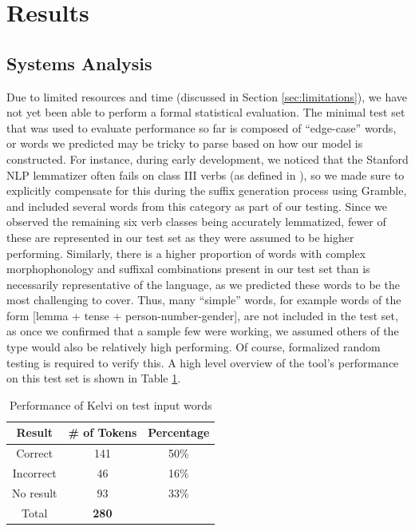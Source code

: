 \documentclass[11pt]{article}
\begin{document}
\section{Results}
\subsection{Systems Analysis}
Due to limited resources and time (discussed in Section \ref{sec:limitations}), 
we have not yet been able to perform a formal statistical evaluation. 
The minimal test set that was used to evaluate performance so far is 
composed of “edge-case” words, or words we predicted may be tricky to 
parse based on how our model is constructed. For instance, during early 
development, we noticed that the Stanford NLP lemmatizer often fails on 
class III verbs (as defined in \citealp{arden_progressive_1910}), so we made sure to explicitly 
compensate for this during the suffix generation process using Gramble, 
and included several words from this category as part of our testing. 
Since we observed the remaining six verb classes \citep{arden_progressive_1910} being 
accurately lemmatized, fewer of these are represented in our test set 
as they were assumed to be higher performing. Similarly, there is a 
higher proportion of words with complex morphophonology and suffixal 
combinations present in our test set than is necessarily representative 
of the language, as we predicted these words to be the most challenging 
to cover. Thus, many “simple” words, for example words of the 
form [lemma + tense + person-number-gender], are not included in the test set, 
as once we confirmed that a sample few were working, we assumed others of the 
type would also be relatively high performing. Of course, formalized 
random testing is required to verify this. A high level overview of the 
tool’s performance on this test set is shown in Table \ref{tab:1}.
\begin{table}[ht]
  \center
  \begin{tabular}{c|c|c}
    Result & \# of Tokens & Percentage\\
    \hline
    Correct & 141 & 50\% \\
    Incorrect & 46 & 16\% \\
    No result & 93 & 33\% \\
    \hline
    Total & \textbf{280} & \\
  \end{tabular}
  \caption{Performance of Kelvi on test input words}
  \label{tab:1}
\end{table}
\end{document}
